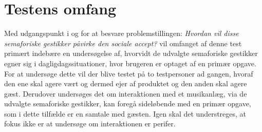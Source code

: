 \section{Testens omfang}
\label{TestensOmfangSocialAccept}
%
Med udgangspunkt i og for at besvare problemstillingen: \textit{Hvordan vil disse semaforiske gestikker påvirke den sociale accept?} vil omfanget af denne test primært indebære en undersøgelse af, hvorvidt de udvalgte semaforiske gestikker egner sig i dagligdagssituationer, hvor brugeren er optaget af en primær opgave. For at undersøge dette vil der blive testet på to testpersoner ad gangen, hvoraf den ene skal agere vært og dermed ejer af produktet og den anden skal agere gæst. Derudover undersøges det om interaktionen med et musikanlæg, via de udvalgte semaforiske gestikker, kan foregå sideløbende med en primær opgave, som i dette tilfælde er en samtale med gæsten. Igen skal det understreges, at fokus ikke er at undersøge om interaktionen er perifer. 

